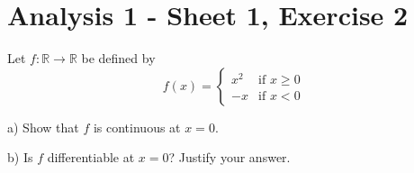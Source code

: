 \documentclass{article}
\begin{document}
\section*{Analysis 1 - Sheet 1, Exercise 2}

Let $f: \mathbb{R} \to \mathbb{R}$ be defined by
$$f(x) = \begin{cases}
x^2 & \text{if } x \geq 0 \\
-x & \text{if } x < 0
\end{cases}$$

a) Show that $f$ is continuous at $x = 0$.

b) Is $f$ differentiable at $x = 0$? Justify your answer.
\end{document}
